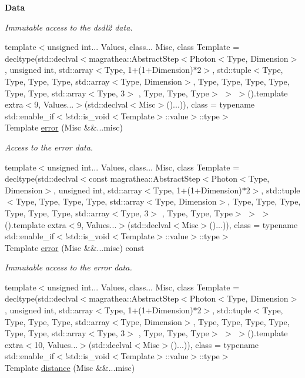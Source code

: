 \begin{Indent}{\bf Data}
\begin{DoxyCompactItemize}
\begin{DoxyCompactList}\small\item\em Immutable access to the dsdl2 data. \end{DoxyCompactList}\item 
{\footnotesize template$<$unsigned int... Values, class... Misc, class Template  = decltype(std\-::declval$<$magrathea\-::\-Abstract\-Step$<$\-Photon$<$\-Type, Dimension$>$, unsigned int, std\-::array$<$\-Type, 1+(1+\-Dimension)$\ast$2$>$, std\-::tuple$<$\-Type, Type, Type, Type, std\-::array$<$\-Type, Dimension$>$, Type, Type, Type, Type, Type, Type, std\-::array$<$\-Type, 3$>$ , Type, Type, Type$>$ $>$ $>$().\-template extra$<$9, Values...$>$(std\-::declval$<$\-Misc$>$()...)), class  = typename std\-::enable\-\_\-if$<$!std\-::is\-\_\-void$<$\-Template$>$\-::value$>$\-::type$>$ }\\Template \hyperlink{exceptionPhoton_afe7cf4761817736ed41369d2c0a01863}{error} (Misc \&\&...misc)
\begin{DoxyCompactList}\small\item\em Access to the error data. \end{DoxyCompactList}\item 
{\footnotesize template$<$unsigned int... Values, class... Misc, class Template  = decltype(std\-::declval$<$const magrathea\-::\-Abstract\-Step$<$\-Photon$<$\-Type, Dimension$>$, unsigned int, std\-::array$<$\-Type, 1+(1+\-Dimension)$\ast$2$>$, std\-::tuple$<$\-Type, Type, Type, Type, std\-::array$<$\-Type, Dimension$>$, Type, Type, Type, Type, Type, Type, std\-::array$<$\-Type, 3$>$ , Type, Type, Type$>$ $>$ $>$().\-template extra$<$9, Values...$>$(std\-::declval$<$\-Misc$>$()...)), class  = typename std\-::enable\-\_\-if$<$!std\-::is\-\_\-void$<$\-Template$>$\-::value$>$\-::type$>$ }\\Template \hyperlink{exceptionPhoton_aa7382e190624895580d699196332959f}{error} (Misc \&\&...misc) const 
\begin{DoxyCompactList}\small\item\em Immutable access to the error data. \end{DoxyCompactList}\item 
{\footnotesize template$<$unsigned int... Values, class... Misc, class Template  = decltype(std\-::declval$<$magrathea\-::\-Abstract\-Step$<$\-Photon$<$\-Type, Dimension$>$, unsigned int, std\-::array$<$\-Type, 1+(1+\-Dimension)$\ast$2$>$, std\-::tuple$<$\-Type, Type, Type, Type, std\-::array$<$\-Type, Dimension$>$, Type, Type, Type, Type, Type, Type, std\-::array$<$\-Type, 3$>$ , Type, Type, Type$>$ $>$ $>$().\-template extra$<$10, Values...$>$(std\-::declval$<$\-Misc$>$()...)), class  = typename std\-::enable\-\_\-if$<$!std\-::is\-\_\-void$<$\-Template$>$\-::value$>$\-::type$>$ }\\Template \hyperlink{exceptionPhoton_aca9f8067009ff03965428d3af391f1e5}{distance} (Misc \&\&...misc)

\end{DoxyCompactItemize}
\end{Indent}
